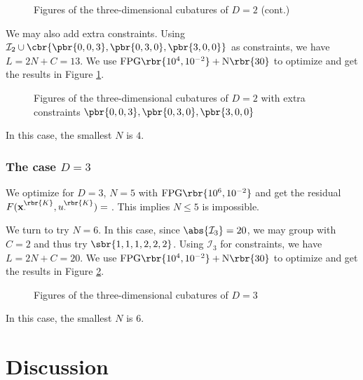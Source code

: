 \documentclass[english, nochinese]{pnote}
\begin{document}
\begin{figure}[htbp]
\ContinuedFloat
\centering
\scalebox{0.75}{}
\scalebox{0.75}{}
\scalebox{0.75}{}
\caption{Figures of the three-dimensional cubatures of $ D = 2 $ (cont.)}
\end{figure}

We may also add extra constraints. Using $ \mathcal{I}_2 \cup \cbr{ \pbr{ 0, 0, 3 }, \pbr{ 0, 3, 0 }, \pbr{ 3, 0, 0 } } $ as constraints, we have $ L = 2 N + C = 13 $. We use $ \text{FPG} \rbr{ 10^4, 10^{-2} } + \text{N} \rbr{30} $ to optimize and get the results in Figure \ref{Fig:M3D2333}.

\begin{figure}[htbp]
\centering
\scalebox{0.75}{}
\scalebox{0.75}{}
\caption{Figures of the three-dimensional cubatures of $ D = 2 $ with extra constraints $ \pbr{ 0, 0, 3 }, \pbr{ 0, 3, 0 }, \pbr{ 3, 0, 0 } $}
\label{Fig:M3D2333}
\end{figure}

In this case, the smallest $N$ is $4$.

\subsubsection{The case $ D = 3 $}

We optimize for $ D = 3 $, $ N = 5 $ with $ \text{FPG} \rbr{ 10^6, 10^{-2} } $ and get the residual $ F ( \mathbf{x}_{\cdot}^{\rbr{K}}, u_{\cdot}^{\rbr{K}} ) = \text{} $. This implies $ N \le 5 $ is impossible.

We turn to try $ N = 6 $. In this case, since $ \abs{\mathcal{I}_3} = 20 $, we may group with $ C = 2 $ and thus try $ \sbr{ 1, 1, 1, 2, 2, 2 } $. Using $\mathcal{I}_3$ for constraints, we have $ L = 2 N + C = 20 $. We use $ \text{FPG} \rbr{ 10^4, 10^{-2} } + \text{N} \rbr{30} $ to optimize and get the results in Figure \ref{Fig:M3D3}.

\begin{figure}[htbp]
\centering
\scalebox{0.75}{}
\scalebox{0.75}{}
\caption{Figures of the three-dimensional cubatures of $ D = 3 $}
\label{Fig:M3D3}
\end{figure}

In this case, the smallest $N$ is $6$.

\section{Discussion}
\end{document}
